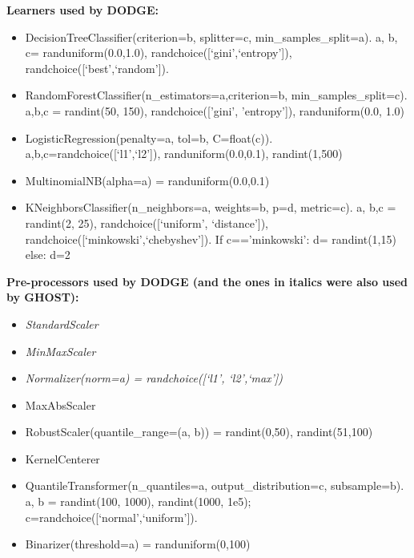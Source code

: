 \documentclass[10pt,compsoc,twocolumn]{IEEEtran}
\newcommand{\bi}{\begin{itemize}}
\newcommand{\ei}{\end{itemize}}
\begin{document}
 
\begin{table}[!t]

\scriptsize
 
 \begin{tcolorbox}[colback=white]
 \begin{flushleft}
\textbf{Learners used by DODGE:}  

\noindent
\begin{itemize}
\item DecisionTreeClassifier(criterion=b, splitter=c, min\_samples\_split=a).
    a, b, c= randuniform(0.0,1.0), randchoice([`gini',`entropy']),   randchoice([`best',`random']).
  
\item RandomForestClassifier(n\_estimators=a,criterion=b,  min\_samples\_split=c).  a,b,c = randint(50, 150), randchoice(['gini', 'entropy']),  randuniform(0.0, 1.0) 
 
\item LogisticRegression(penalty=a, tol=b, C=float(c)).
       a,b,c=randchoice([`l1',`l2']), randuniform(0.0,0.1), randint(1,500)
     
\item MultinomialNB(alpha=a) = randuniform(0.0,0.1)
\item KNeighborsClassifier(n\_neighbors=a, weights=b, p=d, metric=c).  a, b,c  = randint(2, 25), randchoice([`uniform', `distance']),  randchoice([`minkowski',`chebyshev']). 
  If c=='minkowski': d= randint(1,15)  else:  d=2

\end{itemize}


{\bf Pre-processors used by DODGE (and the ones in italics were also used  by GHOST):} 

\bi 
\item \textit{StandardScaler}
\item \textit{MinMaxScaler}
\item \textit{Normalizer(norm=a) = randchoice([`l1', `l2',`max'])}
 \item MaxAbsScaler
 \item RobustScaler(quantile\_range=(a, b)) =  randint(0,50), randint(51,100) 
 \item KernelCenterer
 \item QuantileTransformer(n\_quantiles=a,  output\_distribution=c, subsample=b). a, b = randint(100, 1000), randint(1000, 1e5);
   c=randchoice([`normal',`uniform']).
\item Binarizer(threshold=a) =  randuniform(0,100)
     
\ei
\end{flushleft}
\end{tcolorbox}
\caption{Hyperparameter  options explored by DODGE \cite{agrawal2019dodge}.  GHOST optimizers uses some of these parameters (see the pre-processing options shown in {\em italics}) in the manner discussed in Table~\ref{tab:preprocessors2}.}\label{tab:preprocessors1}
\end{table}
\end{document}
